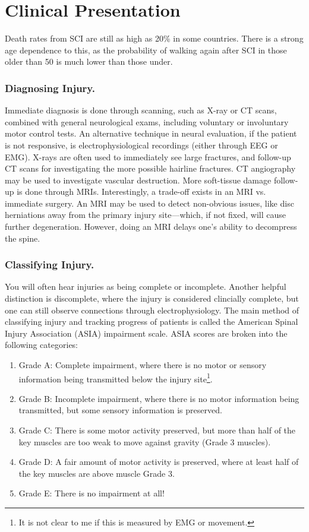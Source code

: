 \documentclass[12pt]{report}
\begin{document}
\section{Clinical Presentation}
Death rates from SCI are still as high as 20\% in some countries. There is a strong age dependence to this, as the probability of walking again after SCI in those older than 50 is much lower than those under.

\subsubsection{Diagnosing Injury.}
Immediate diagnosis is done through scanning, such as X-ray or CT scans, combined with general neurological exams, including voluntary or involuntary motor control tests. An alternative technique in neural evaluation, if the patient is not responsive, is electrophysiological recordings (either through EEG or EMG). X-rays are often used to immediately see large fractures, and follow-up CT scans for investigating the more possible hairline fractures. CT angiography may be used to investigate vascular destruction. More soft-tissue damage follow-up is done through MRIs. Interestingly, a trade-off exists in an MRI vs. immediate surgery. An MRI may be used to detect non-obvious issues, like disc herniations away from the primary injury site---which, if not fixed, will cause further degeneration. However, doing an MRI delays one's ability to decompress the spine.\newline


\subsubsection{Classifying Injury.}
You will often hear injuries as being complete or incomplete. Another helpful distinction is discomplete, where the injury is considered clincially complete, but one can still observe connections through electrophysiology. The main method of classifying injury and tracking progress of patients is called the American Spinal Injury Association (ASIA) impairment scale. ASIA scores are broken into the following categories: 

\begin{enumerate}
    \item Grade A: Complete impairment, where there is no motor or sensory information being transmitted below the injury site\footnote{It is not clear to me if this is measured by EMG or movement.}.
    \item Grade B: Incomplete impairment, where there is no motor information being transmitted, but some sensory information is preserved. 
    \item Grade C: There is some motor activity preserved, but more than half of the key muscles are too weak to move against gravity (Grade 3 muscles). 
    \item Grade D: A fair amount of motor activity is preserved, where at least half of the key muscles are above muscle Grade 3.
    \item Grade E: There is no impairment at all!
\end{enumerate}
\end{document}
